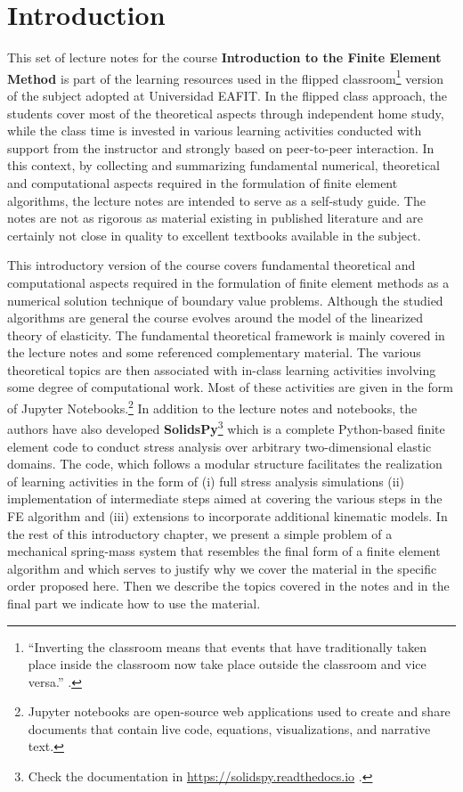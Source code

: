 \graphicspath{ {./img/intro/} }

\chapter{Introduction}

This set of lecture notes for the course {\bf Introduction to the Finite 
Element Method} is part of the learning resources used in the flipped 
classroom\footnote{``Inverting the classroom means that events that have 
traditionally taken place inside the classroom now take place outside the 
classroom and vice versa.'' \citep{lage2000}.} version of the subject 
adopted at Universidad EAFIT. In the flipped class approach, the students cover 
most of the theoretical aspects through independent home study, while the class 
time is invested in various learning activities conducted with support from the 
instructor and strongly based on peer-to-peer interaction. In this context, by 
collecting and summarizing fundamental numerical, theoretical and computational 
aspects required in the formulation of finite element algorithms, the lecture 
notes are intended to serve as a self-study guide. The notes are not as 
rigorous as material existing in published literature and are certainly not 
close in quality to excellent textbooks available in the subject.

This introductory version of the course covers fundamental theoretical and 
computational aspects required in the formulation of finite element methods as 
a numerical solution technique of boundary value problems. Although the studied 
algorithms are general the course evolves around the model of the linearized 
theory of elasticity. The fundamental theoretical framework is mainly covered 
in the lecture notes and some referenced complementary material. The various 
theoretical topics are then associated with in-class learning activities 
involving some degree of computational work. Most of these activities are given 
in the form of Jupyter Notebooks.\footnote{Jupyter notebooks are open-source 
web applications used to create and share documents that contain live code, 
equations, visualizations, and narrative text.} In addition to the lecture 
notes and notebooks, the authors have also developed {\bf 
SolidsPy}\footnote{Check the documentation in 
\url{https://solidspy.readthedocs.io} \cite{solidspy}.} which 
is a complete Python-based finite element code to conduct stress analysis over 
arbitrary two-dimensional elastic domains. The code, which follows a modular 
structure facilitates the realization of learning activities in the form of (i) 
full stress analysis simulations (ii) implementation of intermediate steps 
aimed at covering the various steps in the FE algorithm and (iii) extensions to 
incorporate additional kinematic models. In the rest of this introductory 
chapter, we present a simple problem of a mechanical spring-mass system that 
resembles the final form of a finite element algorithm and which serves to 
justify why we cover the material in the specific order proposed here. Then we 
describe the topics covered in the notes and in the final part we indicate how 
to use the material.

